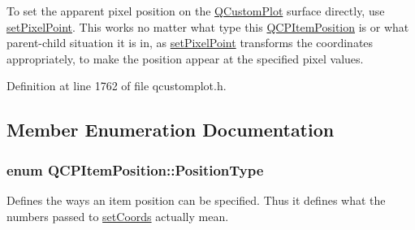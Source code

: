 To set the apparent pixel position on the \hyperlink{class_q_custom_plot}{Q\+Custom\+Plot} surface directly, use \hyperlink{class_q_c_p_item_position_ab404e56d9ac2ac2df0382c57933a71ef}{set\+Pixel\+Point}. This works no matter what type this \hyperlink{class_q_c_p_item_position}{Q\+C\+P\+Item\+Position} is or what parent-\/child situation it is in, as \hyperlink{class_q_c_p_item_position_ab404e56d9ac2ac2df0382c57933a71ef}{set\+Pixel\+Point} transforms the coordinates appropriately, to make the position appear at the specified pixel values. 

Definition at line 1762 of file qcustomplot.\+h.



\subsection{Member Enumeration Documentation}
\hypertarget{class_q_c_p_item_position_aad9936c22bf43e3d358552f6e86dbdc8}{}
\subsubsection[{Position\+Type}]{\setlength{\rightskip}{0pt plus 5cm}enum {\bf Q\+C\+P\+Item\+Position\+::\+Position\+Type}}\label{class_q_c_p_item_position_aad9936c22bf43e3d358552f6e86dbdc8}
Defines the ways an item position can be specified. Thus it defines what the numbers passed to \hyperlink{class_q_c_p_item_position_aa988ba4e87ab684c9021017dcaba945f}{set\+Coords} actually mean.

